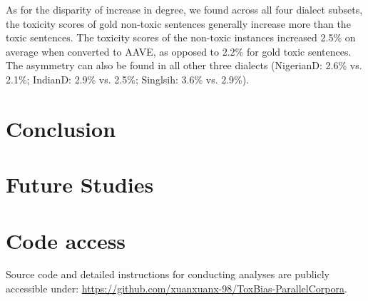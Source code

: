 \documentclass[11pt]{article}
\begin{document}
\newpage

As for the disparity of increase in degree, we found across all four dialect subsets, the toxicity scores of gold non-toxic sentences generally increase more than the toxic sentences. The toxicity scores of the non-toxic instances increased 2.5\% on average when converted to AAVE, as opposed to 2.2\% for gold toxic sentences. The asymmetry can also be found in all other three dialects (NigerianD: 2.6\% vs. 2.1\%; IndianD: 2.9\% vs. 2.5\%; Singlsih: 3.6\% vs. 2.9\%).



































\newpage





\section{Conclusion}

\section{Future Studies}







\appendix

\section{Code access}

Source code and detailed instructions for conducting analyses are publicly accessible under: \href{https://github.com/xuanxuanx-98/ToxBias-ParallelCorpora}{https://github.com/xuanxuanx-98/ToxBias-ParallelCorpora}.
\end{document}
